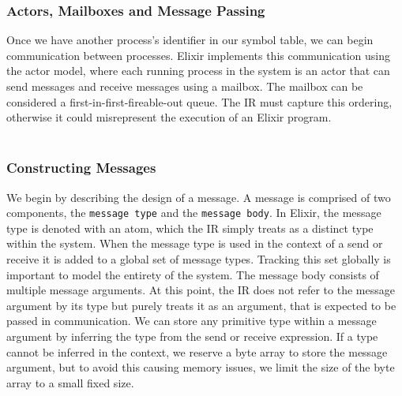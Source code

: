 \subsubsection{Actors, Mailboxes and Message Passing}
Once we have another process's identifier in our symbol table, we can begin communication between processes. Elixir implements this communication using the actor model, where each running process in the system is an actor that can send messages and receive messages using a mailbox. The mailbox can be considered a first-in-first-fireable-out queue. The IR must capture this ordering, otherwise it could misrepresent the execution of an Elixir program.
\\ \\
\subsubsection{Constructing Messages}
We begin by describing the design of a message. A message is comprised of two components, the \texttt{message type} and the \texttt{message body}. In Elixir, the message type is denoted with an atom, which the IR simply treats as a distinct type within the system. When the message type is used in the context of a send or receive it is added to a global set of message types. Tracking this set globally is important to model the entirety of the system. The message body consists of multiple message arguments. At this point, the IR does not refer to the message argument by its type but purely treats it as an argument, that is expected to be passed in communication. We can store any primitive type within a message argument by inferring the type from the send or receive expression. If a type cannot be inferred in the context, we reserve a byte array to store the message argument, but to avoid this causing memory issues, we limit the size of the byte array to a small fixed size.
\\ \\

